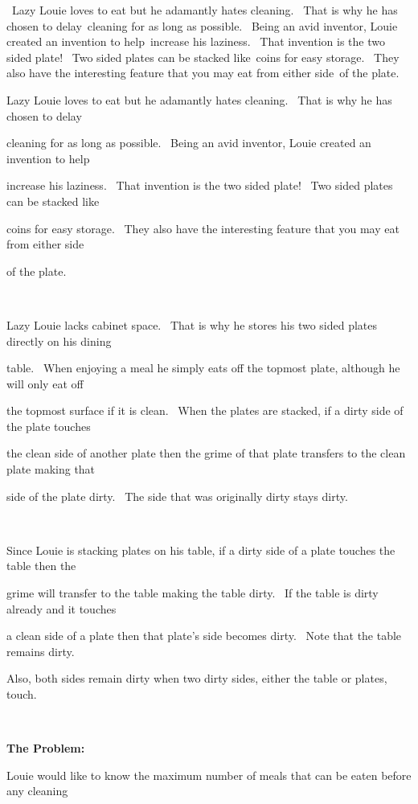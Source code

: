 

 Lazy Louie loves to eat but he adamantly hates cleaning.  That is why he has chosen to delay cleaning for as long as possible.  Being an avid inventor, Louie created an invention to help increase his laziness.  That invention is the two sided plate!  Two sided plates can be stacked like coins for easy storage.  They also have the interesting feature that you may eat from either side of the plate.

Lazy Louie loves to eat but he adamantly hates cleaning.  That is why he has chosen to delay 

cleaning for as long as possible.  Being an avid inventor, Louie created an invention to help 

increase his laziness.  That invention is the two sided plate!  Two sided plates can be stacked like 

coins for easy storage.  They also have the interesting feature that you may eat from either side 

of the plate.

 

Lazy Louie lacks cabinet space.  That is why he stores his two sided plates directly on his dining 

table.  When enjoying a meal he simply eats off the topmost plate, although he will only eat off 

the topmost surface if it is clean.  When the plates are stacked, if a dirty side of the plate touches 

the clean side of another plate then the grime of that plate transfers to the clean plate making that 

side of the plate dirty.  The side that was originally dirty stays dirty.

 

Since Louie is stacking plates on his table, if a dirty side of a plate touches the table then the 

grime will transfer to the table making the table dirty.  If the table is dirty already and it touches 

a clean side of a plate then that plate’s side becomes dirty.  Note that the table remains dirty. 

Also, both sides remain dirty when two dirty sides, either the table or plates, touch.

 

\textbf{The Problem:}

Louie would like to know the maximum number of meals that can be eaten before any cleaning 

